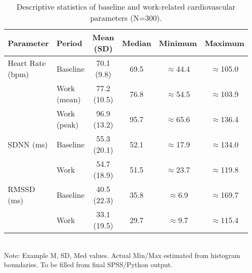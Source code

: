 \documentclass[11pt, a4paper]{report}
\begin{document}
\begin{table}[H]
\centering
\caption{Descriptive statistics of baseline and work-related cardiovascular parameters (N=300).}
\label{tab:physio_baseline_work_results}
\begin{tabular}{@{}l l c c c c@{}}
\toprule
Parameter          & Period       & Mean (SD)      & Median & Minimum & Maximum \\
\midrule
Heart Rate (bpm)   & Baseline     &  70.1 (9.8)    & 69.5   & $\approx$44.4  & $\approx$105.0 \\ %
                   & Work (mean)  &  77.2 (10.5)   & 76.8   & $\approx$54.5  & $\approx$103.9 \\ %
                   & Work (peak)  &  96.9 (13.2)   & 95.7   & $\approx$65.6  & $\approx$136.4 \\ %
SDNN (ms)          & Baseline     &  55.3 (20.1)   & 52.1   & $\approx$17.9  & $\approx$134.0 \\ %
                   & Work         &  54.7 (18.9)   & 51.5   & $\approx$23.7  & $\approx$119.8 \\ %
RMSSD (ms)         & Baseline     &  40.5 (22.3)   & 35.8   & $\approx$6.9   & $\approx$169.7 \\ %
                   & Work         &  33.1 (19.5)   & 29.7   & $\approx$9.7   & $\approx$115.4 \\ %
\bottomrule
\end{tabular}
\\ \footnotesize{Note: Example M, SD, Med values. Actual Min/Max estimated from histogram boundaries. To be filled from final SPSS/Python output.}
\end{table}
\end{document}
